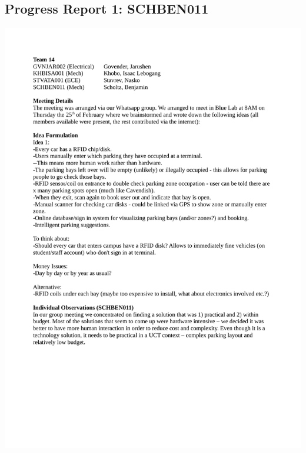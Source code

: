 \subsection*{Progress Report 1: SCHBEN011}
\includegraphics[scale=0.9]{meeting/report1-ben.pdf}

\newpage
